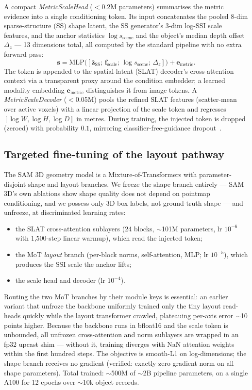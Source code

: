 \documentclass[runningheads]{llncs}
\begin{document}
A compact \emph{MetricScaleHead} ($<$0.2M parameters) summarises the metric evidence into a
single conditioning token. Its input concatenates the pooled 8-dim sparse-structure (SS)
shape latent, the SS generator's 3-dim log-SSI scale features, and the anchor statistics
$\log s_\text{scene}$ and the object's median depth offset $\Delta_z$ --- 13 dimensions
total, all computed by the standard pipeline with no extra forward pass:
\begin{equation}
  \mathbf{s} = \mathrm{MLP}\bigl([\bar{\mathbf{z}}_\text{SS};\, \mathbf{f}_\text{scale};\,
    \log s_\text{scene};\, \Delta_z]\bigr) + \boldsymbol{e}_\text{metric}.
  \label{eq:headeq}
\end{equation}
The token is appended to the spatial-latent (SLAT) decoder's cross-attention context via a
transparent proxy around the condition embedder; a learned modality embedding
$\boldsymbol{e}_\text{metric}$ distinguishes it from image tokens. A
\emph{MetricScaleDecoder} ($<$0.05M) pools the refined SLAT features (scatter-mean over
active voxels) with a linear projection of the scale token and regresses
$[\log W, \log H, \log D]$ in metres. During training, the injected token is dropped
(zeroed) with probability $0.1$, mirroring classifier-free-guidance dropout~\cite{trellis}.

\subsection{Targeted fine-tuning of the layout pathway}
\label{sec:sft}

The SAM 3D geometry model is a Mixture-of-Transformers with parameter-disjoint shape and
layout branches. We freeze the shape branch entirely --- SAM 3D's own ablations show shape
quality does not depend on pointmap conditioning, and we possess only 3D box labels, not
ground-truth shape --- and unfreeze, at discriminated learning rates:
\begin{itemize}
  \item the SLAT cross-attention sublayers (24 blocks, $\sim$101M parameters,
        lr $10^{-6}$ with 1{,}500-step linear warmup), which read the injected token;
  \item the MoT \emph{layout} branch (per-block norms, self-attention, MLP;
        lr $10^{-5}$), which produces the SSI scale the anchor lifts;
  \item the scale head and decoder (lr $10^{-4}$).
\end{itemize}
Routing the two MoT branches by their module keys is essential: an earlier variant that
unfroze the backbone uniformly trained only the tiny layout read-heads quickly while the
layout transformer crawled, plateauing per-axis error $\sim$10 points higher. Because the
backbone runs in bfloat16 and the scale token is unbounded, all unfrozen cross-attention
and norm sublayers are wrapped in an fp32 upcast shim --- without it, training diverges with
NaN attention weights within the first hundred steps. The objective is smooth-L1 on
log-dimensions; the shape branch receives no gradient (verified: exactly zero gradient
norm on all shape parameters). Total trained: $\sim$500M of $\sim$2B pipeline parameters,
on a single A100 for 12 epochs over $\sim$10k object records.
\end{document}
